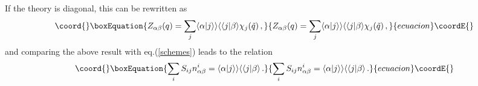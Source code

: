 \documentclass[a4paper,12pt]{report}
\begin{document}
If the theory is diagonal, this can be rewritten as
\begin{equation}\coord{}\boxEquation{
Z_{\alpha\beta}(q)=\sum_{j}\langle\alpha|j\rangle\rangle\langle\langle j|\beta\rangle\chi_{j}(\tilde{q})\,,
}{
Z_{\alpha\beta}(q)=\sum_{j}\langle\alpha|j\rangle\rangle\langle\langle j|\beta\rangle\chi_{j}(\tilde{q})\,,
}{ecuacion}\coordE{}\end{equation}
and comparing the above result with eq.(\ref{schemes}) leads to the relation
\begin{equation}\coord{}\boxEquation{
\sum_{i}S_{ij}n_{\alpha\beta}^{i}=\langle\alpha|j\rangle\rangle\langle\langle j|\beta\rangle\,.
}{
\sum_{i}S_{ij}n_{\alpha\beta}^{i}=\langle\alpha|j\rangle\rangle\langle\langle j|\beta\rangle\,.
}{ecuacion}\coordE{}\end{equation}
\end{document}
